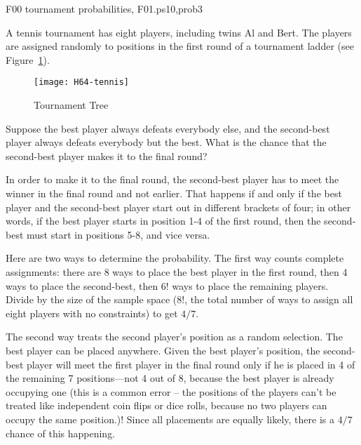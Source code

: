 \begin{problem}
\begin{staffnotes}
F00 tournament probabilities, F01.ps10,prob3
\end{staffnotes}

A tennis tournament has eight players, including twins Al and Bert.
The players are assigned randomly to positions in the first round of a
tournament ladder (see Figure~\ref{tennis}).

\begin{figure}%
\centerline{\texttt{[image: H64-tennis]}}
\caption{Tournament Tree}
\label{tennis}
\end{figure}

\bparts

\ppart
Suppose the best player always defeats everybody else, and
the second-best player always defeats everybody but the best. What
is the chance that the second-best player makes it to the final round?

\begin{solution}
In order to make it to the final round, the
second-best player has to meet
the winner in the final round and not earlier.
That happens if and only if the best
player and the second-best player start out in different brackets of
four; in other words, if the best player starts in position 1-4 of the
first round, then the second-best must start in positions 5-8, and
vice versa.

Here are two ways to determine the probability.  The first way counts
complete assignments: there are 8 ways to place the best player in the
first round, then 4 ways to place the second-best, then $6!$ ways to
place the remaining players.  Divide by the size of the sample space
($8!$, the total number of ways to assign all eight players with no
constraints) to get $4/7$.

The second way treats the second player's position as a random selection.
The best player can be placed anywhere.  Given the best player's position,
the second-best player will meet the first player in the final round
only if he is placed in 4 of the remaining 7 positions---not 4 out of 8,
because the best player is already occupying one (this is a common error
-- the positions of the players can't be treated like independent coin
flips or dice rolls, because no two players can occupy the same
position.)!  Since all placements are equally likely, there is a $4/7$
chance of this happening.
\end{solution}


\end{problem}
